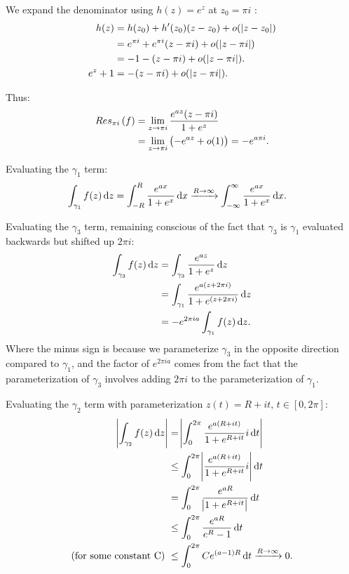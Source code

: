 \begin{example}
We expand the denominator using $h(z) = e^z$ at $z_0 = \pi i$ :
\begin{align*}
    h(z) &= h(z_0) + h'(z_0)(z-z_0) + o( \, \abs{z-z_0})\\
    &= e^{\pi i} + e^{\pi i} (z- \pi i) +  o( \, \abs{z-\pi i})\\
    &= -1 -(z-\pi i) + o( \, \abs{z-\pi i}).\\
    e^z + 1 &= -(z-\pi i) + o( \, \abs{z-\pi i}).
\end{align*}

Thus:
\begin{align*}
    Res_{\pi i} \left( f \right) &= \lim_{z \to \pi i} \frac{e^{az} (z-\pi i)}{1+e^z}\\
    &= \lim_{z \to \pi i} \left( -e^{az} + o(1) \right) = - e^{a\pi i}.
\end{align*}

Evaluating the $\gamma_1$ term:
\begin{align*}
    \int_{\gamma_1} f(z) \dif z &= \int_{-R}^R \frac{e^{ax}}{1+e^x} \dif x \xrightarrow[]{R \to \infty } \int_{-\infty}^\infty \frac{e^{ax}}{1+e^x} \dif x.
\end{align*}

Evaluating the $\gamma_3$ term, remaining conscious of the fact that $\gamma_3$ is $\gamma_1$ evaluated backwards but shifted up $2 \pi i$:
\begin{align*}
    \int_{\gamma_3} f(z) \dif z &= \int_{\gamma_3} \frac{e^{az}}{1+e^z} \dif z\\
    &= \int_{\gamma_1} \frac{e^{a(z+2\pi i)}}{1+e^{(z+2\pi i)}} \dif z\\
    &= - e^{2\pi i a} \int_{\gamma_1}  f(z) \dif z.
\end{align*}
 Where the minus sign is because we parameterize $\gamma_3$ in the opposite direction compared to $\gamma_1$, and the factor of $e^{2\pi i a}$ comes from the fact that the parameterization of $\gamma_3$ involves adding $2\pi i$ to the parameterization of $\gamma_1$.

Evaluating the $\gamma_2$ term with parameterization $z(t) = R + it, \, t \in [0,2\pi ]$:
\begin{align*}
    \abs{\int_{\gamma_2} f(z) \dif z }&=\abs{ \int_0^{2\pi} \frac{e^{a(R+it)}}{1+e^{R+it}} i \dif t }\\
    &\leq  \int_0^{2\pi} \abs{ \frac{e^{a(R+it)}}{1+e^{R+it}} i} \dif t \\
    &= \int_0^{2\pi} \frac{e^{aR}}{\abs{ 1+e^{R+it} }} \dif t\\
    &\leq \int_0^{2\pi}  \frac{e^{aR}}{e^R -1 }       \dif t\\
    \text{(for some constant C) }&\leq \int_0^{2\pi}  C e^{(a-1)R}       \dif t \xrightarrow[]{R \to \infty} 0.
\end{align*}


\end{example}
